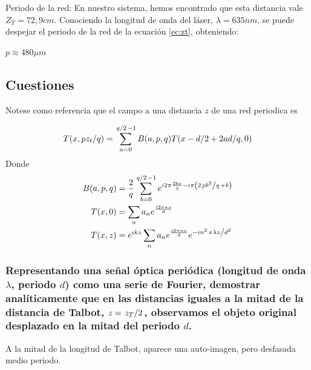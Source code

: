 \documentclass{./packages/optica-article}
\begin{document}
Periodo de la red:
En nuestro sistema, hemos encontrado que esta distancia vale $Z_T = 72,9 cm$. Conociendo la longitud de onda del láser, $\lambda = 635 nm$, se puede despejar el periodo de la red de la ecuación \ref{ec:zt}, obteniendo:
\begin{center}
	$p \approx 480 \mu m$
\end{center}


\subsection{Cuestiones}

Notese como referencia que el campo a una distancia $z$ de una red periodica es

\begin{equation}\label{eq:talbot}
	T(x, p z_t / q ) = \sum_{a=0}^{\flatfrac q 2 - 1} B(a, p, q) T (x - d/2 + 2ad/q, 0)
\end{equation}
Donde
\begin{align}
	\label{eq:talbot:t}
	B(a,p,q) & = \frac 2 q \sum_{b=0}^{\flatfrac q 2 - 1} e^{i 2 \pi \frac{2ba}{q} - i\pi \left(2 \flatfrac{p b^2}{q} + b\right)} \\
	T(x,0)   & =
	\sum_{n} a_n e^{\frac{i 2 \pi n x} {d}}                                                                                       \\
	T(x,z)   & =
	e^{ikz}
	\sum_{n} a_n e^{\frac{i 2 \pi n x} {d}} e^{- i n^2 \flatfrac{ \pi \lambda z } {d^2}}
\end{align}

\subsubsection{Representando una señal óptica periódica (longitud de onda $\lambda$, periodo $d$) como una serie de Fourier, demostrar analíticamente que en las distancias iguales a la mitad de la distancia de Talbot, $z=\flatfrac{z_{T}}{2}$, observamos el objeto original desplazado en la mitad del periodo $d$.}


A la mitad de la longitud de Talbot, aparece una auto-imagen, pero desfasada medio periodo.
\end{document}
